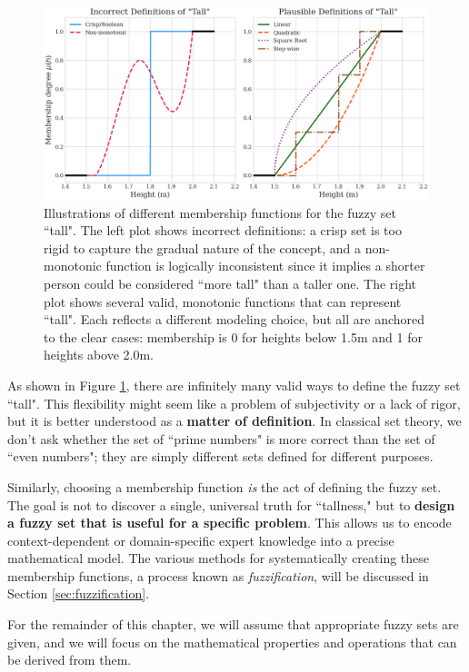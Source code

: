 \begin{figure}[!ht]
    \centering
    \includegraphics[width=\textwidth]{ch1/figures/Fuzzy_tall.png}
    \caption{Illustrations of different membership functions for the fuzzy set ``tall". The left plot shows incorrect definitions: a crisp set is too rigid to capture the gradual nature of the concept, and a non-monotonic function is logically inconsistent since it implies a shorter person could be considered ``more tall" than a taller one. The right plot shows several valid, monotonic functions that can represent ``tall". Each reflects a different modeling choice, but all are anchored to the clear cases: membership is 0 for heights below 1.5m and 1 for heights above 2.0m.}
    \label{fig:tall_definitions}
\end{figure}

As shown in Figure \ref{fig:tall_definitions}, there are infinitely many valid ways to define the fuzzy set ``tall". This flexibility might seem like a problem of subjectivity or a lack of rigor, but it is better understood as a \textbf{matter of definition}. In classical set theory, we don't ask whether the set of ``prime numbers" is more correct than the set of ``even numbers"; they are simply different sets defined for different purposes. 

Similarly, choosing a membership function \emph{is} the act of defining the fuzzy set. The goal is not to discover a single, universal truth for ``tallness," but to \textbf{design a fuzzy set that is useful for a specific problem}. This allows us to encode context-dependent or domain-specific expert knowledge into a precise mathematical model. The various methods for systematically creating these membership functions, a process known as \textit{fuzzification}, will be discussed in Section \ref{sec:fuzzification}.

For the remainder of this chapter, we will assume that appropriate fuzzy sets are given, and we will focus on the mathematical properties and operations that can be derived from them.


